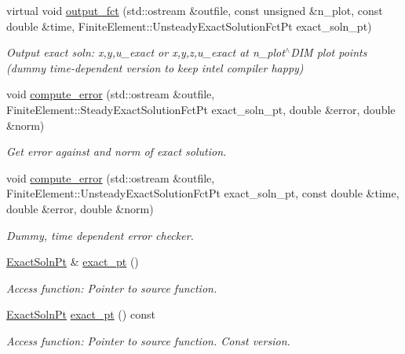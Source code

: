 \begin{DoxyCompactItemize}
virtual void \hyperlink{classoomph_1_1MyBiharmonicEquations_a95b35b18fac5212ade1a81c26657bcdb}{output\+\_\+fct} (std\+::ostream \&outfile, const unsigned \&n\+\_\+plot, const double \&time, Finite\+Element\+::\+Unsteady\+Exact\+Solution\+Fct\+Pt exact\+\_\+soln\+\_\+pt)
\begin{DoxyCompactList}\small\item\em Output exact soln\+: x,y,u\+\_\+exact or x,y,z,u\+\_\+exact at n\+\_\+plot$^\wedge$\+D\+IM plot points (dummy time-\/dependent version to keep intel compiler happy) \end{DoxyCompactList}\item 
void \hyperlink{classoomph_1_1MyBiharmonicEquations_ac605d044c4e8c0483dcdf9b3b9e6634d}{compute\+\_\+error} (std\+::ostream \&outfile, Finite\+Element\+::\+Steady\+Exact\+Solution\+Fct\+Pt exact\+\_\+soln\+\_\+pt, double \&error, double \&norm)
\begin{DoxyCompactList}\small\item\em Get error against and norm of exact solution. \end{DoxyCompactList}\item 
void \hyperlink{classoomph_1_1MyBiharmonicEquations_a617b8c8dc3dbac7aeb9d466f6da4edb9}{compute\+\_\+error} (std\+::ostream \&outfile, Finite\+Element\+::\+Unsteady\+Exact\+Solution\+Fct\+Pt exact\+\_\+soln\+\_\+pt, const double \&time, double \&error, double \&norm)
\begin{DoxyCompactList}\small\item\em Dummy, time dependent error checker. \end{DoxyCompactList}\item 
\hyperlink{classoomph_1_1MyBiharmonicEquations_a20238fec79ab67b90f3be58ea498e681}{Exact\+Soln\+Pt} \& \hyperlink{classoomph_1_1MyBiharmonicEquations_a74abbb3a09de067c3c10547b2ccc1ddd}{exact\+\_\+pt} ()
\begin{DoxyCompactList}\small\item\em Access function\+: Pointer to source function. \end{DoxyCompactList}\item 
\hyperlink{classoomph_1_1MyBiharmonicEquations_a20238fec79ab67b90f3be58ea498e681}{Exact\+Soln\+Pt} \hyperlink{classoomph_1_1MyBiharmonicEquations_a6b2d15cfd6501f68a6d0e61f4c02eb99}{exact\+\_\+pt} () const
\begin{DoxyCompactList}\small\item\em Access function\+: Pointer to source function. Const version. \end{DoxyCompactList}\item 

\end{DoxyCompactItemize}

